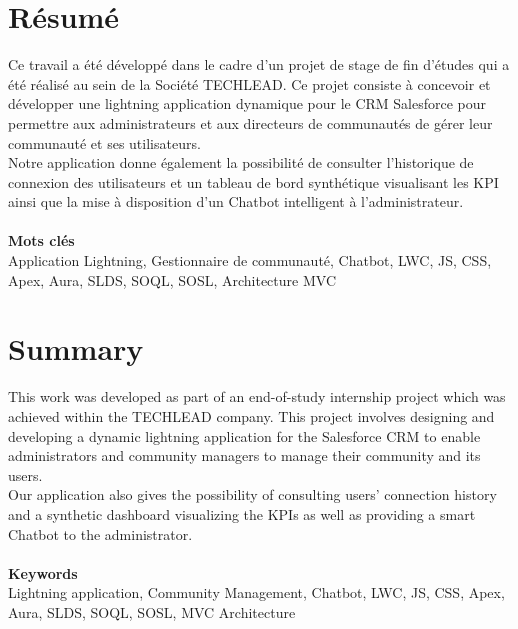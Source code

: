 
\chapter*{Résumé}
\thispagestyle{empty}
\begingroup
\centering


Ce travail a été développé dans le cadre d'un projet de stage de fin d'études qui a été réalisé au sein de la
Société TECHLEAD.
Ce projet consiste à concevoir et développer une lightning application dynamique pour le CRM Salesforce
pour permettre aux administrateurs et aux directeurs de communautés de gérer leur communauté et ses utilisateurs.\\
Notre application donne également
la possibilité de consulter l'historique de connexion des utilisateurs et un tableau de bord synthétique visualisant les KPI ainsi que la mise à disposition d'un Chatbot intelligent à l'administrateur.\\~\\
\textbf{Mots clés}\\
Application Lightning, Gestionnaire de communauté, Chatbot, LWC, JS, CSS, Apex, Aura, SLDS, SOQL, SOSL, 
Architecture MVC

\endgroup
\cleardoublepage%









\chapter*{Summary}
\thispagestyle{empty}
\begingroup
\centering

This work was developed as part of an end-of-study internship project which was achieved within the
TECHLEAD company.
This project involves designing and developing a dynamic lightning application for the Salesforce CRM
to enable administrators and community managers to manage their community and its users.\\
Our application also gives
the possibility of consulting users' connection history and a synthetic dashboard visualizing the KPIs as well as providing a smart Chatbot to the administrator.\\~\\
\textbf{Keywords}\\
Lightning application, Community Management, Chatbot, LWC, JS, CSS, Apex, Aura, SLDS, SOQL, SOSL, 
MVC Architecture

\endgroup




